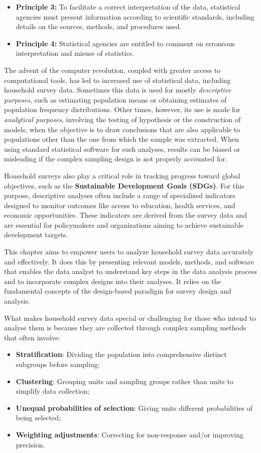 \documentclass[
  12pt,
]{book}
\providecommand{\tightlist}{%
  \setlength{\itemsep}{0pt}\setlength{\parskip}{0pt}}
\begin{document}
\begin{itemize}
\tightlist
\item
  \textbf{Principle 3:} To facilitate a correct interpretation of the data, statistical agencies must present information according to scientific standards, including details on the sources, methods, and procedures used.
\item
  \textbf{Principle 4:} Statistical agencies are entitled to comment on erroneous interpretation and misuse of statistics.
\end{itemize}

The advent of the computer revolution, coupled with greater access to computational tools, has led to increased use of statistical data, including household survey data. Sometimes this data is used for mostly \emph{descriptive purposes}, such as estimating population means or obtaining estimates of population frequency distributions. Other times, however, its use is made for \emph{analytical purposes}, involving the testing of hypothesis or the construction of models, when the objective is to draw conclusions that are also applicable to populations other than the one from which the sample was extracted. When using standard statistical software for such analyses, results can be biased or misleading if the complex sampling design is not properly accounted for.

Household surveys also play a critical role in tracking progress toward global objectives, such as the \textbf{Sustainable Development Goals (SDGs)}. For this purpose, descriptive analyses often include a range of specialized indicators designed to monitor outcomes like access to education, health services, and economic opportunities. These indicators are derived from the survey data and are essential for policymakers and organizations aiming to achieve sustainable development targets.

This chapter aims to empower users to analyze household survey data accurately and effectively. It does this by presenting relevant models, methods, and software that enables the data analyst to understand key steps in the data analysis process and to incorporate complex designs into their analyses. It relies on the fundamental concepts of the design-based paradigm for survey design and analysis.

What makes household survey data special or challenging for those who intend to analyse them is because they are collected through complex sampling methods that often involve:

\begin{itemize}
\tightlist
\item
  \textbf{Stratification}: Dividing the population into comprehensive distinct subgroups before sampling;
\item
  \textbf{Clustering}: Grouping units and sampling groups rather than units to simplify data collection;
\item
  \textbf{Unequal probabilities of selection}: Giving units different probabilities of being selected;
\item
  \textbf{Weighting adjustments}: Correcting for non-response and/or improving precision.
\end{itemize}
\end{document}
